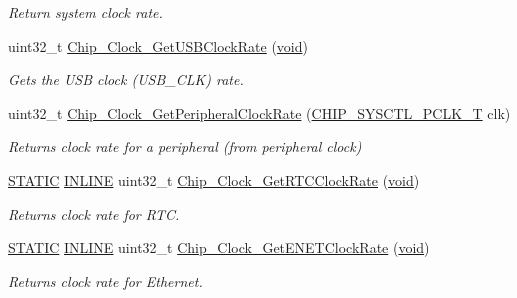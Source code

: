 \begin{DoxyCompactItemize}
\begin{DoxyCompactList}\small\item\em Return system clock rate. \end{DoxyCompactList}\item 
uint32\-\_\-t \hyperlink{group__CLOCK__17XX__40XX_gac8679aba3cc005f859604a09ceceb4a4}{Chip\-\_\-\-Clock\-\_\-\-Get\-U\-S\-B\-Clock\-Rate} (\hyperlink{Paradigm_2Tern__EE_2small_2portmacro_8h_a14d32f8130d3c0b212cfc751730b5b49}{void})
\begin{DoxyCompactList}\small\item\em Gets the U\-S\-B clock (U\-S\-B\-\_\-\-C\-L\-K) rate. \end{DoxyCompactList}\item 
uint32\-\_\-t \hyperlink{group__CLOCK__17XX__40XX_ga9c2bc86c857119426aa6a724c12a6f42}{Chip\-\_\-\-Clock\-\_\-\-Get\-Peripheral\-Clock\-Rate} (\hyperlink{group__CLOCK__17XX__40XX_ga7af78c5752bdd11a908ec9b11e2ecffc}{C\-H\-I\-P\-\_\-\-S\-Y\-S\-C\-T\-L\-\_\-\-P\-C\-L\-K\-\_\-\-T} clk)
\begin{DoxyCompactList}\small\item\em Returns clock rate for a peripheral (from peripheral clock) \end{DoxyCompactList}\item 
\hyperlink{group__LPC__Types__Public__Macros_ga10b2d890d871e1489bb02b7e70d9bdfb}{S\-T\-A\-T\-I\-C} \hyperlink{group__LPC__Types__Public__Types_ga2eb6f9e0395b47b8d5e3eeae4fe0c116}{I\-N\-L\-I\-N\-E} uint32\-\_\-t \hyperlink{group__CLOCK__17XX__40XX_ga7c09db016cc48f17aca47d96b0d68814}{Chip\-\_\-\-Clock\-\_\-\-Get\-R\-T\-C\-Clock\-Rate} (\hyperlink{Paradigm_2Tern__EE_2small_2portmacro_8h_a14d32f8130d3c0b212cfc751730b5b49}{void})
\begin{DoxyCompactList}\small\item\em Returns clock rate for R\-T\-C. \end{DoxyCompactList}\item 
\hyperlink{group__LPC__Types__Public__Macros_ga10b2d890d871e1489bb02b7e70d9bdfb}{S\-T\-A\-T\-I\-C} \hyperlink{group__LPC__Types__Public__Types_ga2eb6f9e0395b47b8d5e3eeae4fe0c116}{I\-N\-L\-I\-N\-E} uint32\-\_\-t \hyperlink{group__CLOCK__17XX__40XX_ga04af0fa6fa72517538fc3d3918fcc0d9}{Chip\-\_\-\-Clock\-\_\-\-Get\-E\-N\-E\-T\-Clock\-Rate} (\hyperlink{Paradigm_2Tern__EE_2small_2portmacro_8h_a14d32f8130d3c0b212cfc751730b5b49}{void})
\begin{DoxyCompactList}\small\item\em Returns clock rate for Ethernet. \end{DoxyCompactList}\item 

\end{DoxyCompactItemize}
